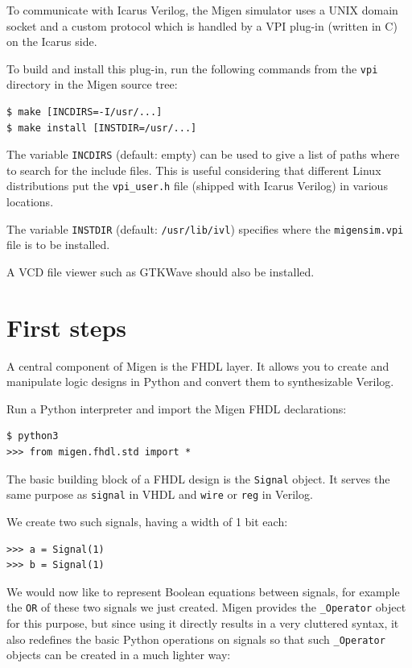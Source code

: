 \documentclass[11pt]{paper}
\begin{document}
To communicate with Icarus Verilog, the Migen simulator uses a UNIX domain socket and a custom protocol which is handled by a VPI plug-in (written in C) on the Icarus side.

To build and install this plug-in, run the following commands from the \verb!vpi! directory in the Migen source tree:

\begin{verbatim}
$ make [INCDIRS=-I/usr/...]
$ make install [INSTDIR=/usr/...]
\end{verbatim}

The variable \verb!INCDIRS! (default: empty) can be used to give a list of paths where to search for the include files. This is useful considering that different Linux distributions put the \verb!vpi_user.h! file (shipped with Icarus Verilog) in various locations.

The variable \verb!INSTDIR! (default: \verb!/usr/lib/ivl!) specifies where the \verb!migensim.vpi! file is to be installed.

A VCD file viewer such as GTKWave should also be installed.

\section{First steps}
A central component of Migen is the FHDL layer. It allows you to create and manipulate logic designs in Python and convert them to synthesizable Verilog.

Run a Python interpreter and import the Migen FHDL declarations:
\begin{verbatim}
$ python3
>>> from migen.fhdl.std import *
\end{verbatim}

The basic building block of a FHDL design is the \verb!Signal! object. It serves the same purpose as \verb!signal! in VHDL and \verb!wire! or \verb!reg! in Verilog.

We create two such signals, having a width of 1 bit each:
\begin{verbatim}
>>> a = Signal(1)
>>> b = Signal(1)
\end{verbatim}


We would now like to represent Boolean equations between signals, for example the \verb!OR! of these two signals we just created. Migen provides the \verb!_Operator! object for this purpose, but since using it directly results in a very cluttered syntax, it also redefines the basic Python operations on signals so that such \verb!_Operator! objects can be created in a much lighter way:
\end{document}
